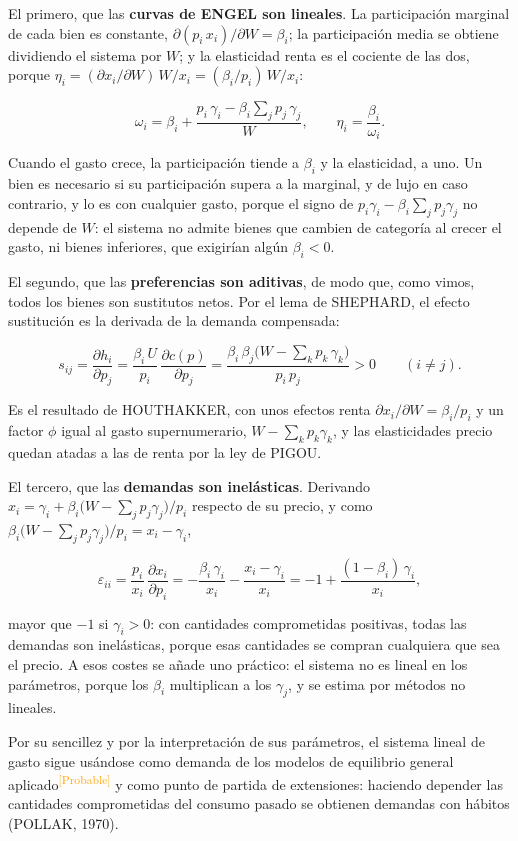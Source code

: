 \documentclass[10pt,a4paper]{article}
\begin{document}
El primero, que las \textbf{curvas de ENGEL son lineales}. La participación marginal de cada bien es constante, $\partial(p_i\,x_i)/\partial W=\beta_i$; la participación media se obtiene dividiendo el sistema por $W$; y la elasticidad renta es el cociente de las dos, porque $\eta_i=(\partial x_i/\partial W)\,W/x_i=(\beta_i/p_i)\,W/x_i$:

$$\omega_i=\beta_i+\frac{p_i\,\gamma_i-\beta_i\sum_jp_j\,\gamma_j}{W},\qquad \eta_i=\frac{\beta_i}{\omega_i}.$$

Cuando el gasto crece, la participación tiende a $\beta_i$ y la elasticidad, a uno. Un bien es necesario si su participación supera a la marginal, y de lujo en caso contrario, y lo es con cualquier gasto, porque el signo de $p_i\gamma_i-\beta_i\sum_jp_j\gamma_j$ no depende de $W$: el sistema no admite bienes que cambien de categoría al crecer el gasto, ni bienes inferiores, que exigirían algún $\beta_i<0$.

El segundo, que las \textbf{preferencias son aditivas}, de modo que, como vimos, todos los bienes son sustitutos netos. Por el lema de SHEPHARD, el efecto sustitución es la derivada de la demanda compensada:

$$s_{ij}=\frac{\partial h_i}{\partial p_j}=\frac{\beta_i\,U}{p_i}\,\frac{\partial c(p)}{\partial p_j}=\frac{\beta_i\,\beta_j\big(W-\sum_kp_k\,\gamma_k\big)}{p_i\,p_j}>0\qquad(i\neq j).$$

Es el resultado de HOUTHAKKER, con unos efectos renta $\partial x_i/\partial W=\beta_i/p_i$ y un factor $\phi$ igual al gasto supernumerario, $W-\sum_kp_k\gamma_k$, y las elasticidades precio quedan atadas a las de renta por la ley de PIGOU.

El tercero, que las \textbf{demandas son inelásticas}. Derivando $x_i=\gamma_i+\beta_i\big(W-\sum_jp_j\gamma_j\big)/p_i$ respecto de su precio, y como $\beta_i\big(W-\sum_jp_j\gamma_j\big)/p_i=x_i-\gamma_i$,

$$\varepsilon_{ii}=\frac{p_i}{x_i}\,\frac{\partial x_i}{\partial p_i}=-\frac{\beta_i\,\gamma_i}{x_i}-\frac{x_i-\gamma_i}{x_i}=-1+\frac{(1-\beta_i)\,\gamma_i}{x_i},$$

mayor que $-1$ si $\gamma_i>0$: con cantidades comprometidas positivas, todas las demandas son inelásticas, porque esas cantidades se compran cualquiera que sea el precio. A esos costes se añade uno práctico: el sistema no es lineal en los parámetros, porque los $\beta_i$ multiplican a los $\gamma_j$, y se estima por métodos no lineales.

Por su sencillez y por la interpretación de sus parámetros, el sistema lineal de gasto sigue usándose como demanda de los modelos de equilibrio general aplicado\textcolor{orange}{\textsuperscript{[Probable]}} y como punto de partida de extensiones: haciendo depender las cantidades comprometidas del consumo pasado se obtienen demandas con hábitos (POLLAK, 1970).
\end{document}
